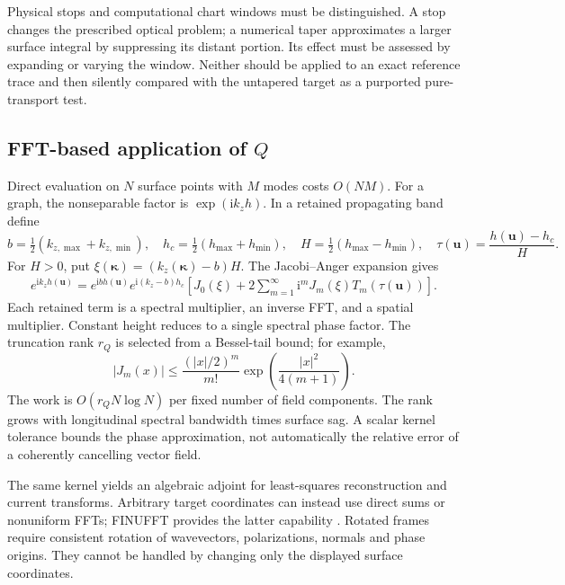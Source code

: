\documentclass[11pt,a4paper]{article}
\newcommand{\vct}[1]{\bm{#1}}
\newcommand{\kap}{\vct\kappa}
\newcommand{\ii}{\mathrm i}
\numberwithin{equation}{section}
\begin{document}
Physical stops and computational chart windows must be distinguished. A stop
changes the prescribed optical problem; a numerical taper approximates a
larger surface integral by suppressing its distant portion. Its effect must be
assessed by expanding or varying the window. Neither should be applied to an
exact reference trace and then silently compared with the untapered target
as a purported pure-transport test.

\subsection{FFT-based application of \texorpdfstring{$Q$}{Q}}

Direct evaluation on $N$ surface points with $M$ modes costs $O(NM)$.
For a graph, the nonseparable factor is $\exp(\ii k_z h)$. In a retained
propagating band define
\begin{equation}
 b=\tfrac12(k_{z,\max}+k_{z,\min}),\quad
 h_c=\tfrac12(h_{\max}+h_{\min}),\quad
 H=\tfrac12(h_{\max}-h_{\min}),\quad
 \tau(\vct u)=\frac{h(\vct u)-h_c}{H}.
\end{equation}
For $H>0$, put $\xi(\kap)=(k_z(\kap)-b)H$. The Jacobi--Anger expansion gives
\begin{align}
 e^{\ii k_z h(\vct u)}
 =e^{\ii b h(\vct u)}e^{\ii(k_z-b)h_c}
 \left[J_0(\xi)+2\sum_{m=1}^{\infty}\ii^m J_m(\xi)T_m(\tau(\vct u))\right].
 \label{eq:chebQ}
\end{align}
Each retained term is a spectral multiplier, an inverse FFT, and a spatial
multiplier. Constant height reduces to a single spectral phase factor.
The truncation rank $r_Q$ is selected from a Bessel-tail bound; for example,
\begin{equation}
 |J_m(x)|\le\frac{(|x|/2)^m}{m!}
             \exp\!\left(\frac{|x|^2}{4(m+1)}\right).
\end{equation}
The work is $O(r_QN\log N)$ per fixed number of field components.
The rank grows with longitudinal spectral bandwidth times surface sag.
A scalar kernel tolerance bounds the phase approximation, not automatically
the relative error of a coherently cancelling vector field.

The same kernel yields an algebraic adjoint for least-squares reconstruction
and current transforms. Arbitrary target coordinates can instead use direct
sums or nonuniform FFTs; FINUFFT provides the latter capability
\cite{Barnett2019}. Rotated frames require consistent rotation of wavevectors,
polarizations, normals and phase origins. They cannot be handled by changing
only the displayed surface coordinates.
\end{document}
